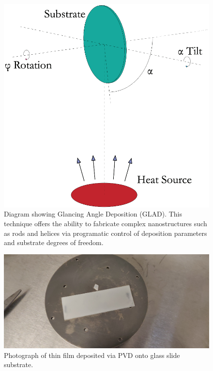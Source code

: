 \begin{figure}[t]
  \centering
  \includegraphics[width=.8\textwidth]{figs/4-Raman/GLAD.png}
  \caption{Diagram showing Glancing Angle Deposition (\acs{GLAD}). This technique offers the ability to fabricate complex nanostructures such as rods and helices via programatic control of deposition parameters and substrate degrees of freedom.}
  \label{fig:Raman:GLAD}
\end{figure}

\begin{figure}[t]
  \centering
  \includegraphics[width=\textwidth]{figs/4-Raman/slide-with-TeO2-film-on-substrate.jpeg}
  \caption{Photograph of  thin film deposited via \ac{PVD} onto glass slide substrate.}%
  \label{fig:Raman:TeO2onSubstrate}
\end{figure}


